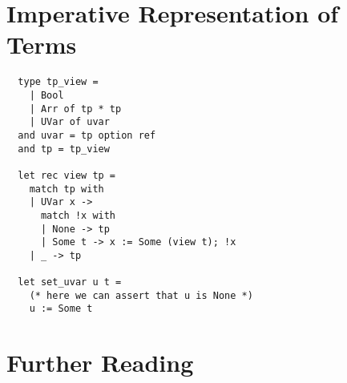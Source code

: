 \section{Imperative Representation of Terms}

\begin{verbatim}
  type tp_view = 
    | Bool
    | Arr of tp * tp
    | UVar of uvar
  and uvar = tp option ref
  and tp = tp_view

  let rec view tp = 
    match tp with
    | UVar x ->
      match !x with
      | None -> tp
      | Some t -> x := Some (view t); !x
    | _ -> tp

  let set_uvar u t =
    (* here we can assert that u is None *)
    u := Some t
\end{verbatim}

\section{Further Reading}
